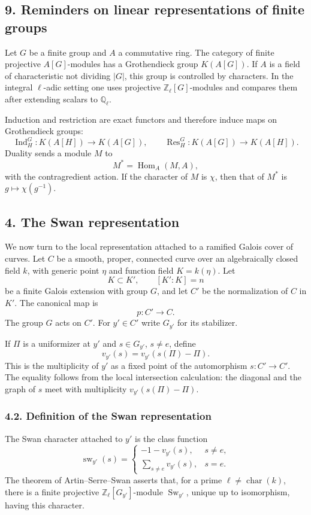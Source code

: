 \documentclass[11pt]{article}
\theoremstyle{plain}
\theoremstyle{definition}
\theoremstyle{remark}
\newcommand{\QQ}{\mathbb Q}
\newcommand{\ZZ}{\mathbb Z}
\DeclareMathOperator{\Hom}{Hom}
\providecommand{\Sw}{\operatorname{Sw}}
\begin{document}
\subsection*{9. Reminders on linear representations of finite groups}

Let $G$ be a finite group and $A$ a commutative ring. The category of finite projective $A[G]$-modules has a Grothendieck group $K(A[G])$. If $A$ is a field of characteristic not dividing $|G|$, this group is controlled by characters. In the integral $\ell$-adic setting one uses projective $\ZZ_\ell[G]$-modules and compares them after extending scalars to $\QQ_\ell$.

Induction and restriction are exact functors and therefore induce maps on Grothendieck groups:
\[
   \operatorname{Ind}_H^G:K(A[H])\to K(A[G]),
   \qquad
   \operatorname{Res}_H^G:K(A[G])\to K(A[H]).
\]
Duality sends a module $M$ to
\[
   M^*=\Hom_A(M,A),
\]
with the contragredient action. If the character of $M$ is $\chi$, then that of $M^*$ is $g\mapsto\chi(g^{-1})$.

\subsection*{4. The Swan representation}

We now turn to the local representation attached to a ramified Galois cover of curves. Let $C$ be a smooth, proper, connected curve over an algebraically closed field $k$, with generic point $\eta$ and function field $K=k(\eta)$. Let
\[
   K\subset K',\qquad [K':K]=n
\]
be a finite Galois extension with group $G$, and let $C'$ be the normalization of $C$ in $K'$. The canonical map is
\[
   p:C'\to C.
\]
The group $G$ acts on $C'$. For $y'\in C'$ write $G_{y'}$ for its stabilizer.

If $\Pi$ is a uniformizer at $y'$ and $s\in G_{y'}$, $s\ne e$, define
\[
   v_{y'}(s)=v_{y'}(s(\Pi)-\Pi).
\]
This is the multiplicity of $y'$ as a fixed point of the automorphism $s:C'\to C'$. The equality follows from the local intersection calculation: the diagonal and the graph of $s$ meet with multiplicity $v_{y'}(s(\Pi)-\Pi)$.

\subsubsection*{4.2. Definition of the Swan representation}

The Swan character attached to $y'$ is the class function
\[
   \operatorname{sw}_{y'}(s)=
   \begin{cases}
      -1-v_{y'}(s), & s\ne e,\\[0.3em]
      \sum_{s\ne e}v_{y'}(s), & s=e.
   \end{cases}
\]
The theorem of Artin--Serre--Swan asserts that, for a prime $\ell\ne\operatorname{char}(k)$, there is a finite projective $\ZZ_\ell[G_{y'}]$-module $\Sw_{y'}$, unique up to isomorphism, having this character.
\end{document}
